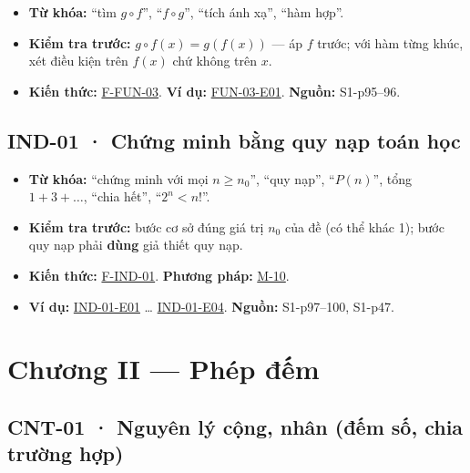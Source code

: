 \documentclass[
  10pt,
  twoside,openany]{book}
\providecommand{\tightlist}{%
  \setlength{\itemsep}{0pt}\setlength{\parskip}{0pt}}
\begin{document}
\begin{itemize}
\tightlist
\item
  \textbf{Từ khóa:} ``tìm \(g\circ f\)'', ``\(f\circ g\)'', ``tích ánh
  xạ'', ``hàm hợp''.
\item
  \textbf{Kiểm tra trước:} \(g\circ f(x)=g(f(x))\) --- áp \(f\) trước;
  với hàm từng khúc, xét điều kiện trên \textbf{\(f(x)\)} chứ không trên
  \(x\).
\item
  \textbf{Kiến thức:} \protect\hyperlink{F-FUN-03}{F-FUN-03}. \textbf{Ví
  dụ:} \protect\hyperlink{FUN-03-E01}{FUN-03-E01}. \textbf{Nguồn:}
  S1-p95--96.
\end{itemize}

\hypertarget{IND-01}{%
\subsection{IND-01 · Chứng minh bằng quy nạp toán học}\label{IND-01}}

\begin{itemize}
\tightlist
\item
  \textbf{Từ khóa:} ``chứng minh với mọi \(n\ge n_0\)'', ``quy nạp'',
  ``\(P(n)\)'', tổng \(1+3+\dots\), ``chia hết'', ``\(2^n<n!\)''.
\item
  \textbf{Kiểm tra trước:} bước cơ sở đúng giá trị \(n_0\) của đề (có
  thể khác 1); bước quy nạp phải \textbf{dùng} giả thiết quy nạp.
\item
  \textbf{Kiến thức:} \protect\hyperlink{F-IND-01}{F-IND-01}.
  \textbf{Phương pháp:} \protect\hyperlink{M-10}{M-10}.
\item
  \textbf{Ví dụ:} \protect\hyperlink{IND-01-E01}{IND-01-E01} \ldots{}
  \protect\hyperlink{IND-01-E04}{IND-01-E04}. \textbf{Nguồn:}
  S1-p97--100, S1-p47.
\end{itemize}

\hypertarget{chux1b0ux1a1ng-ii-phuxe9p-ux111ux1ebfm}{%
\section{Chương II --- Phép
đếm}\label{chux1b0ux1a1ng-ii-phuxe9p-ux111ux1ebfm}}

\hypertarget{CNT-01}{%
\subsection{CNT-01 · Nguyên lý cộng, nhân (đếm số, chia trường
hợp)}\label{CNT-01}}
\end{document}
